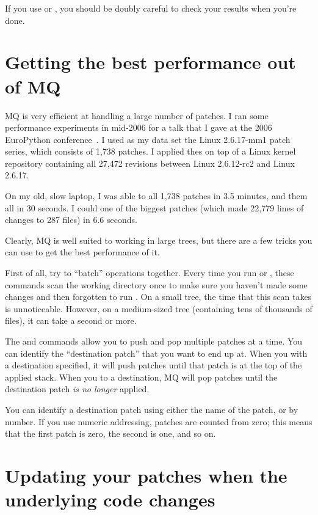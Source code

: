If you use  or , you should be doubly
careful to check your results when you're done.

\section{Getting the best performance out of MQ}

MQ is very efficient at handling a large number of patches.  I ran
some performance experiments in mid-2006 for a talk that I gave at the
2006 EuroPython conference~\cite{web:europython}.  I used as my data
set the Linux 2.6.17-mm1 patch series, which consists of 1,738
patches.  I applied thes on top of a Linux kernel repository
containing all 27,472 revisions between Linux 2.6.12-rc2 and Linux
2.6.17.

On my old, slow laptop, I was able to
 all 1,738 patches in 3.5 minutes,
and  them all in 30 seconds.  I
could  one of the biggest patches (which made 22,779
lines of changes to 287 files) in 6.6 seconds.

Clearly, MQ is well suited to working in large trees, but there are a
few tricks you can use to get the best performance of it.

First of all, try to ``batch'' operations together.  Every time you
run  or , these commands scan the working
directory once to make sure you haven't made some changes and then
forgotten to run .  On a small tree, the time that
this scan takes is unnoticeable.  However, on a medium-sized tree
(containing tens of thousands of files), it can take a second or more.

The  and  commands allow you to push and pop
multiple patches at a time.  You can identify the ``destination
patch'' that you want to end up at.  When you  with a
destination specified, it will push patches until that patch is at the
top of the applied stack.  When you  to a destination, MQ
will pop patches until the destination patch \emph{is no longer}
applied.

You can identify a destination patch using either the name of the
patch, or by number.  If you use numeric addressing, patches are
counted from zero; this means that the first patch is zero, the second
is one, and so on.

\section{Updating your patches when the underlying code changes}
\label{sec:mq:merge}

